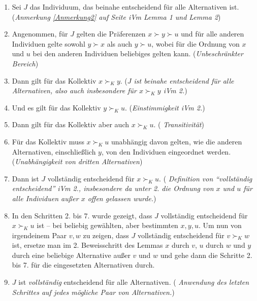 \begin{enumerate}
  \item Sei $J$ das Individuum, das beinahe entscheidend für alle
  Alternativen ist. ({\em Anmerkung \ref{Anmerkung2} auf Seite
  \pageref{Anmerkung2} iVm Lemma 1 und Lemma 2})
 
  \item Angenommen, für $J$ gelten die Präferenzen $x \succ y \succ u$ und für
  alle anderen Individuen gelte sowohl $y \succ x$ als auch $y \succ u$,
  wobei für die Ordnung von $x$ und $u$ bei den anderen Individuen beliebiges
  gelten kann. ({\em Unbeschränkter Bereich})
  
  \item Dann gilt für das Kollektiv $x \succ_K y$. ({\em $J$ ist beinahe
  entscheidend für alle Alternativen, also auch insbesondere für $x \succ_K y$
  iVm 2.})
  
  \item Und es gilt für das Kollektiv $y \succ_K u$. ({\em Einstimmigkeit iVm
  2.})
  
  \item Dann gilt für das Kollektiv aber auch $x \succ_K u$. ({\em
  Transitivität})
  
  \item Für das Kollektiv muss $x \succ_K u$ unabhängig davon gelten, wie die
  anderen Alternativen, einschließlich $y$, von den Individuen eingeordnet
  werden. ({\em Unabhängigkeit von dritten Alternativen})
  
  \item Dann ist $J$ vollständig entscheidend für $x \succ_K u$. ({\em
  Definition von "`vollständig entscheidend"' iVm 2., insbesondere da unter
  2. die Ordnung von $x$ und $u$ für alle Individuen außer $x$ offen gelassen
  wurde.})

  \item \label{Lemma3Schritt8} In den Schritten 2. bis 7. wurde gezeigt, dass
  $J$ vollständig entscheidend für $x \succ_K u$ ist -- bei beliebig gewählten, aber bestimmten
  $x,y,u$. Um nun von irgendeinem Paar $v,w$ zu zeigen, dass $J$ vollständig
  entscheidend für $v \succ_K w$ ist, ersetze man im 2. Beweisschritt des Lemmas
  $x$ durch $v$, $u$ durch $w$ und $y$ durch eine beliebige Alternative außer $v$
  und $w$ und gehe dann die Schritte 2. bis 7. für die eingesetzten Alternativen
  durch.

  \item $J$ ist {\em vollständig} entscheidend für alle Alternativen. ({\em
  Anwendung des letzten Schrittes auf jedes mögliche Paar von Alternativen.})
  
\end{enumerate}

